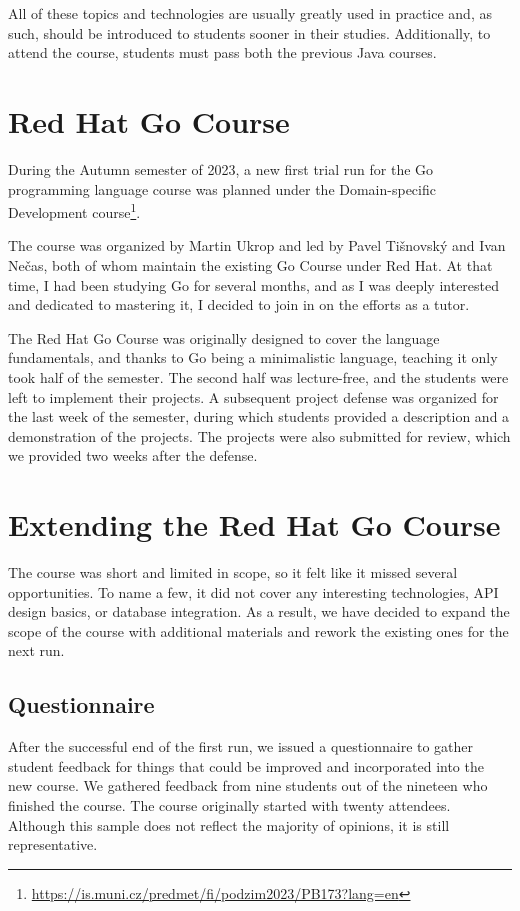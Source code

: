 \documentclass[
  digital,
  color,
  oneside,
  nosansbold,
  nocolorbold,
  lof,
  nolot,
]{fithesis4}
\begin{document}
All of these topics and technologies are usually greatly used in practice and, as such, should be introduced to students sooner in their studies. Additionally, to attend the course, students must pass both the previous Java courses.

\section{Red Hat Go Course}

During the Autumn semester of 2023, a new first trial run for the Go programming language course was planned under the Domain-specific Development course\footnote{ \url{https://is.muni.cz/predmet/fi/podzim2023/PB173?lang=en}}.

The course was organized by Martin Ukrop and led by Pavel Tišnovský and Ivan Nečas, both of whom maintain the existing Go Course \cite{redhat-go-course} under Red Hat. At that time, I had been studying Go for several months, and as I was deeply interested and dedicated to mastering it, I decided to join in on the efforts as a tutor.

The Red Hat Go Course was originally designed to cover the language fundamentals, and thanks to Go being a minimalistic language, teaching it only took half of the semester. The second half was lecture-free, and the students were left to implement their projects. A subsequent project defense was organized for the last week of the semester, during which students provided a description and a demonstration of the projects. The projects were also submitted for review, which we provided two weeks after the defense.

\section{Extending the Red Hat Go Course}

The course was short and limited in scope, so it felt like it missed several opportunities. To name a few, it did not cover any interesting technologies, API design basics, or database integration. As a result, we have decided to expand the scope of the course with additional materials and rework the existing ones for the next run.

\subsection{Questionnaire}

After the successful end of the first run, we issued a questionnaire to gather student feedback for things that could be improved and incorporated into the new course. We gathered feedback from nine students out of the nineteen who finished the course. The course originally started with twenty attendees. Although this sample does not reflect the majority of opinions, it is still representative.
\end{document}
